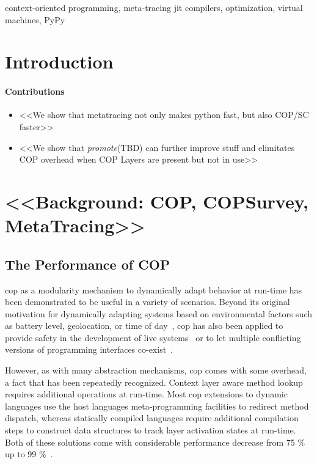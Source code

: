 \documentclass[preprint,english,10pt,nonatbib]{sigplanconf}
\begin{document}

\keywords
context-oriented programming,
meta-tracing \acs{jit} compilers,
optimization,
virtual machines,
PyPy

\section{Introduction}

\paragraph*{Contributions}

\begin{itemize}
\item <<We show that metatracing not only makes python fast, but also COP/SC
  faster>>
\item <<We show that \emph{promote}(TBD) can further improve stuff and
  elimitates COP overhead when COP Layers are present but not in use>>
\end{itemize}

\section{<<Background: COP, COPSurvey, MetaTracing>>}

\subsection{The Performance of COP}
\label{sec:performance-cop}
\ac{cop} as a modularity mechanism to dynamically adapt behavior at run-time has
been demonstrated to be useful in a variety of scenarios. Beyond its original
motivation for dynamically adapting systems based on environmental factors such
as battery level, geolocation, or time of day~, \ac{cop} has also
been applied to provide safety in the development of live
systems~\cite{lincke+:2012:scoping-changes} or to let multiple conflicting
versions of programming interfaces co-exist~. 

However, as with many abstraction mechanisms, \ac{cop} comes with some overhead,
a fact that has been repeatedly recognized. Context layer aware method lookup
requires additional operations at run-time. Most \ac{cop} extensions to dynamic
languages use the host languages meta-programming facilities to redirect method
dispatch, whereas statically compiled languages require additional compilation
steps to construct data structures to track layer activation states at
run-time. Both of these solutions come with considerable performance decrease
from 75 \% up to 99 \%~\cite{appeltauer+:2009:comparison-context-oriented}.
\end{document}

